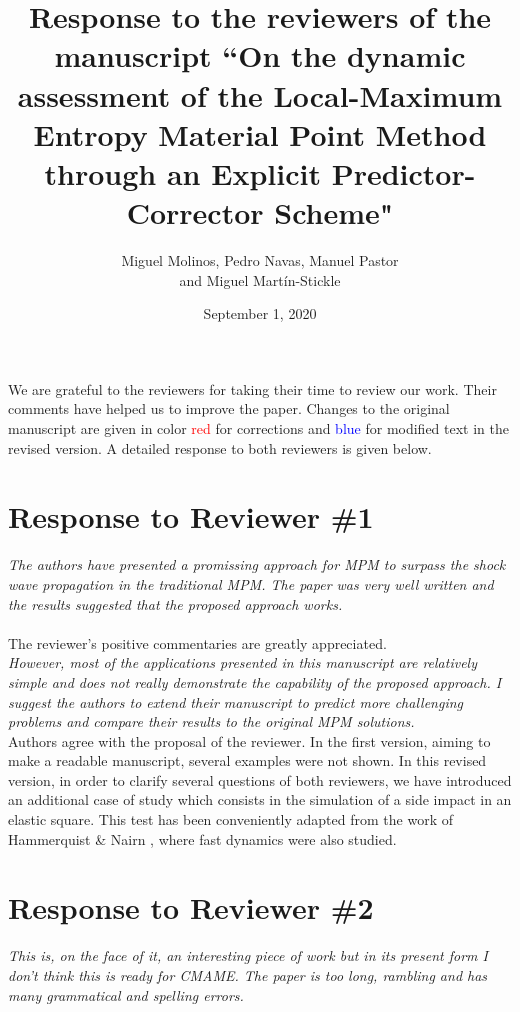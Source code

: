 \documentclass[12pt]{article}
\title{Response to the reviewers of the manuscript ``On the dynamic assessment of the Local-Maximum Entropy Material Point Method through an Explicit Predictor-Corrector Scheme"}
\author{Miguel Molinos, Pedro Navas, Manuel Pastor\\
and Miguel Mart\'in-Stickle}
\date{September 1, 2020}
\begin{document}
\maketitle

We  are grateful to the reviewers for taking their time  to review our work. Their comments have helped us to improve the paper. Changes to the original manuscript are given in  color \textcolor{red}{red} for corrections and  \textcolor{blue}{blue} for modified text in the revised version.  A detailed response to both reviewers is given below.

\section*{Response to Reviewer \#1}
{\it
The authors have presented a promissing approach for MPM to surpass the shock wave propagation in the traditional MPM. The paper was very well written and the results suggested that the proposed approach works.
}
\\
\\
The reviewer's positive commentaries are greatly appreciated.
\\
\textit{However, most of the applications presented in this manuscript are relatively simple and does not really demonstrate the capability of the proposed approach. I suggest the authors to extend their manuscript to predict more challenging problems and compare their results to the original MPM solutions.}\\

Authors agree with the proposal of the reviewer. In the first version, aiming to make a readable manuscript, several examples were not shown. In this revised version, in order to clarify several questions of both reviewers, we have introduced an additional case of study which consists in the simulation of a side impact in an elastic square. This test has been conveniently adapted from the work of Hammerquist \& Nairn \cite{HAMMERQUIST2017724}, where fast dynamics were also studied.

\hspace{5mm}



\section*{Response to Reviewer \#2}

\textit {This is, on the face of it, an interesting piece of work but in its present form I don't think this is ready for CMAME. The paper is too long, rambling and has many grammatical and spelling errors. }\\
\end{document}
